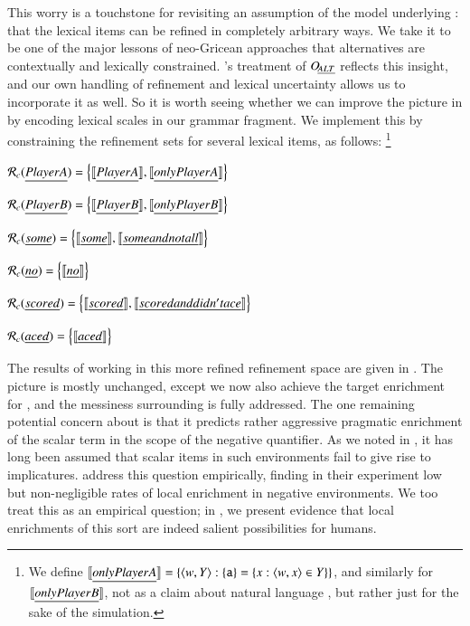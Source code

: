\documentclass[leqno,12pt]{article}
\begin{document}
This worry is a touchstone for revisiting an
assumption of the model underlying : that the lexical
items can be refined in completely arbitrary ways. We take it to be one of the
major lessons of neo-Gricean approaches that alternatives are
contextually and lexically constrained. \CFS's treatment of $\mathop{O\negthinspace_{\emph{ALT}}}$
reflects this insight, and our own handling of refinement and lexical
uncertainty allows us to incorporate it as well. So it is worth seeing
whether we can improve the picture in  by
encoding lexical scales in our grammar fragment.  We
implement this by constraining the refinement sets for
several lexical items, as follows:%
\footnote{We define $\llbracket\emph{only Player A}\rrbracket = \left\{ \langle w, Y \rangle : \left\{ \texttt{a} \right\} = \left\{ x : \langle w,x \rangle \in Y \right\} \right\}$,
  and similarly for $\llbracket\emph{only Player B}\rrbracket$, not as a claim about natural language , but rather just 
  for the sake of the simulation.}
%
\begin{examples}
\item\label{neo}
  \begin{examples}
  \item $\mathcal{R}_{c}(\emph{Player A}) = \left\{ \llbracket\emph{Player A}\rrbracket, \llbracket\emph{only Player A}\rrbracket \right\}$
  \item $\mathcal{R}_{c}(\emph{Player B}) = \left\{ \llbracket\emph{Player B}\rrbracket, \llbracket\emph{only Player B}\rrbracket \right\}$
  \item $\mathcal{R}_{c}(\emph{some}) = \left\{ \llbracket\emph{some}\rrbracket, \llbracket\emph{some and not all}\rrbracket \right\}$
  \item $\mathcal{R}_{c}(\emph{no}) = \left\{ \llbracket\emph{no}\rrbracket \right\}$    
  \item $\mathcal{R}_{c}(\emph{scored}) = \left\{ \llbracket\emph{scored}\rrbracket, \llbracket\emph{scored and didn't ace}\rrbracket \right\}$
  \item $\mathcal{R}_{c}(\emph{aced}) = \left\{ \llbracket\emph{aced}\rrbracket \right\}$
  \end{examples}
\end{examples}
%
The results of working in this more refined refinement space are given
in . The picture is mostly unchanged,
except we now also achieve the target enrichment for , and the messiness surrounding  is
fully addressed. The one remaining potential concern about
 is that it predicts rather aggressive
pragmatic enrichment of the scalar term in the scope of the negative
quantifier. As we noted in , it has long been
assumed that scalar items in such environments fail to give rise to
implicatures. \citet{Chemla:Spector:2011} address this question
empirically, finding in their experiment low but non-negligible rates of local
enrichment in negative environments. We too treat this as an
empirical question; in , we present evidence that
local enrichments of this sort are indeed salient possibilities for
humans.
\end{document}
